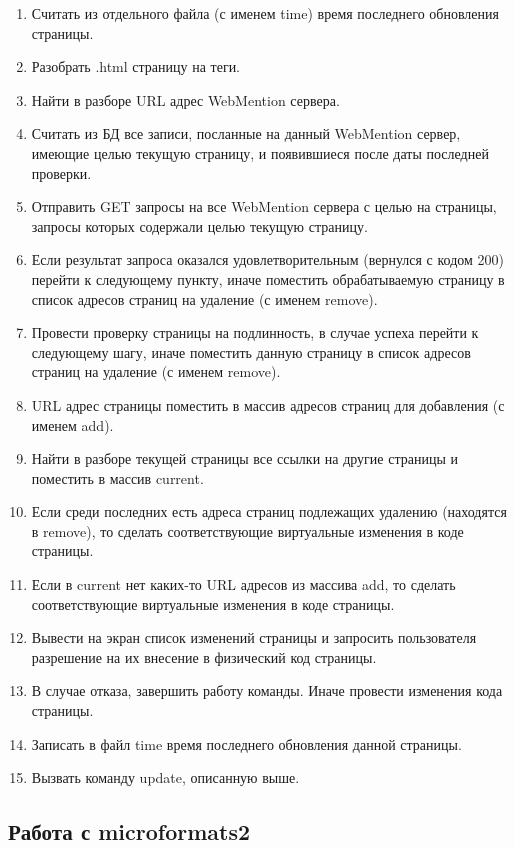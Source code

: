 \begin{enumerate}
\def\labelenumi{\arabic{enumi}.}
\tightlist
\item
  Считать из отдельного файла (с именем time) время последнего
  обновления страницы.
\item
  Разобрать .html страницу на теги.
\item
  Найти в разборе URL адрес WebMention сервера.
\item
  Считать из БД все записи, посланные на данный WebMention сервер,
  имеющие целью текущую страницу, и появившиеся после даты последней
  проверки.
\item
  Отправить GET запросы на все WebMention сервера с целью на страницы,
  запросы которых содержали целью текущую страницу.
\item
  Если результат запроса оказался удовлетворительным (вернулся с кодом
  200) перейти к следующему пункту, иначе поместить обрабатываемую
  страницу в список адресов страниц на удаление (с именем remove).
\item
  Провести проверку страницы на подлинность, в случае успеха перейти к
  следующему шагу, иначе поместить данную страницу в список адресов
  страниц на удаление (с именем remove).
\item
  URL адрес страницы поместить в массив адресов страниц для добавления
  (с именем add).
\item
  Найти в разборе текущей страницы все ссылки на другие страницы и
  поместить в массив current.
\item
  Если среди последних есть адреса страниц подлежащих удалению
  (находятся в remove), то сделать соответствующие виртуальные изменения
  в коде страницы.
\item
  Если в current нет каких-то URL адресов из массива add, то сделать
  соответствующие виртуальные изменения в коде страницы.
\item
  Вывести на экран список изменений страницы и запросить пользователя
  разрешение на их внесение в физический код страницы.
\item
  В случае отказа, завершить работу команды. Иначе провести изменения
  кода страницы.
\item
  Записать в файл time время последнего обновления данной страницы.
\item
  Вызвать команду update, описанную выше.
\end{enumerate}

\hypertarget{ux440ux430ux431ux43eux442ux430-ux441-microformats2}{%
\subsection{Работа с
microformats2}\label{ux440ux430ux431ux43eux442ux430-ux441-microformats2}}

